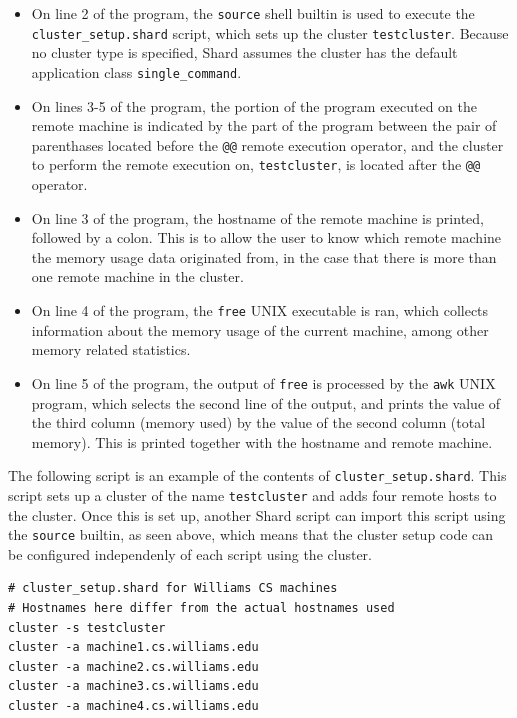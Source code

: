 \documentclass[twoside]{report}
\begin{document}
\begin{itemize}
  \item On line 2 of the program, the \texttt{source} shell builtin is used to execute the \texttt{cluster\_setup.shard} script, which sets up the cluster \texttt{testcluster}.
        Because no cluster type is specified, Shard assumes the cluster has the default application class \texttt{single\_command}.
  \item On lines 3-5 of the program, the portion of the program executed on the remote machine is indicated by the part of the program between the pair of parenthases located before the \texttt{@@} remote execution operator, and the cluster to perform the remote execution on, \texttt{testcluster}, is located after the \texttt{@@} operator.
  \item On line 3 of the program, the hostname of the remote machine is printed, followed by a colon. This is to allow the user to know which remote machine the memory usage data originated from, in the case that there is more than one remote machine in the cluster.
  \item On line 4 of the program, the \texttt{free} UNIX executable is ran, which collects information about the memory usage of the current machine, among other memory related statistics.
  \item On line 5 of the program, the output of \texttt{free} is processed by the \texttt{awk} UNIX program, which selects the second line of the output, and prints the value of the third column (memory used) by the value of the second column (total memory). This is printed together with the hostname and remote machine.
\end{itemize}

The following script is an example of the contents of \texttt{cluster\_setup.shard}.
This script sets up a cluster of the name \texttt{testcluster} and adds four remote hosts to the cluster.
Once this is set up, another Shard script can import this script using the \texttt{source} builtin, as seen above, which means that the cluster setup code can be configured independenly of each script using the cluster.

\begin{lstlisting}[language=Shard]
# cluster_setup.shard for Williams CS machines
# Hostnames here differ from the actual hostnames used
cluster -s testcluster
cluster -a machine1.cs.williams.edu
cluster -a machine2.cs.williams.edu
cluster -a machine3.cs.williams.edu
cluster -a machine4.cs.williams.edu
\end{lstlisting}
\end{document}
